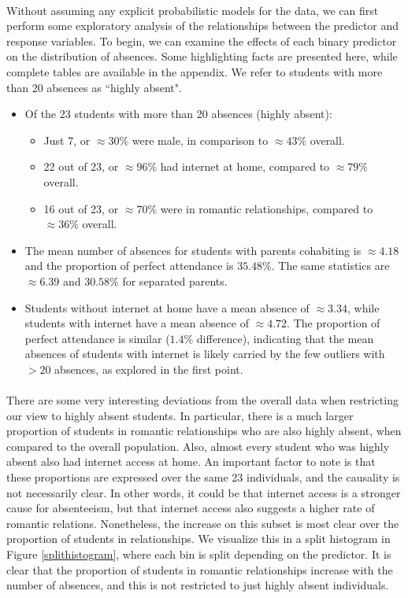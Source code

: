 \documentclass[12pt, titlepage]{article}
\begin{document}
	\paragraph{} Without assuming any explicit probabilistic models for the data, we can first perform some exploratory analysis of the relationships between the predictor and response variables. To begin, we can examine the effects of each binary predictor on the distribution of absences. Some highlighting facts are presented here, while complete tables are available in the appendix. We refer to students with more than 20 absences as ``highly absent".  
	\begin{itemize}
		\item Of the 23 students with more than 20 absences (highly absent):
		\begin{itemize}
			\item Just 7, or $\approx 30\%$ were male, in comparison to $\approx 43\%$ overall.
			\item 22 out of 23, or $\approx 96\%$ had internet at home, compared to $\approx 79\%$ overall.
			\item 16 out of 23, or $\approx 70\%$ were in romantic relationships, compared to $\approx 36\%$ overall.
		\end{itemize}
		\item The mean number of absences for students with parents cohabiting is $\approx 4.18$ and the proportion of perfect attendance is $35.48\%$. The same statistics are $\approx 6.39$ and $30.58\%$ for separated parents. 
		\item Students without internet at home have a mean absence of $\approx 3.34$, while students with internet have a mean absence of $\approx 4.72$. The proportion of perfect attendance is similar ($1.4\%$ difference), indicating that the mean absences of students with internet is likely carried by the few outliers with $>20$ absences, as explored in the first point. 
	\end{itemize}
	
	\paragraph{}There are some very interesting deviations from the overall data when restricting our view to highly absent students. In particular, there is a much larger proportion of students in romantic relationships who are also highly absent, when compared to the overall population. Also, almost every student who was highly absent also had internet access at home. An important factor to note is that these proportions are expressed over the same 23 individuals, and the causality is not necessarily clear. In other words, it could be that internet access is a stronger cause for absenteeism, but that internet access also suggests a higher rate of romantic relations. Nonetheless, the increase on this subset is most clear over the proportion of students in relationships. We visualize this in a split histogram in Figure \ref{splithistogram}, where each bin is split depending on the predictor. It is clear that the proportion of students in romantic relationships increase with the number of absences, and this is not restricted to just highly absent individuals. 
	
\end{document}
